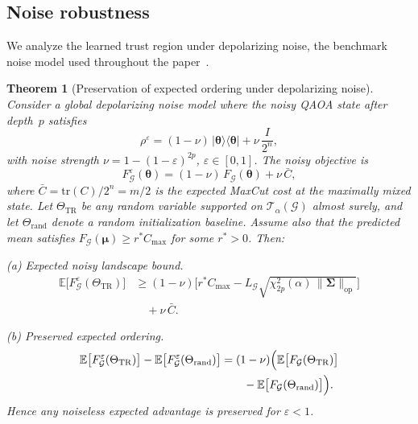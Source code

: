 \documentclass[aps,prx,reprint,superscriptaddress,longbibliography]{revtex4-2}
\newcommand{\ket}[1]{|#1\rangle}
\newcommand{\bra}[1]{\langle#1|}
\newcommand{\QAOA}{\textnormal{\textsc{QAOA}}}
\newcommand{\calG}{\mathcal{G}}
\newcommand{\calT}{\mathcal{T}}
\newcommand{\bbE}{\mathbb{E}}
\newtheorem{theorem}{Theorem}
\begin{document}
\subsection{Noise robustness}
\label{sec:noise_theory}

We analyze the learned trust region under depolarizing noise, the
benchmark noise model used throughout the paper~\cite{wang2021noise,preskill2018}.

\begin{theorem}[Preservation of expected ordering under depolarizing noise]
\label{thm:noise_robust}
Consider a global depolarizing noise model where the noisy \QAOA{}
state after depth~$p$ satisfies
\begin{equation}
    \rho^{\varepsilon} = (1 - \nu)\,
    \ket{\bm\theta}\!\bra{\bm\theta}
    + \nu\,\frac{I}{2^n},
    \label{eq:noisy_state}
\end{equation}
with noise strength $\nu = 1 - (1-\varepsilon)^{2p}$,
$\varepsilon \in [0,1]$.
The noisy objective is
\begin{equation}
    F_\calG^\varepsilon(\bm\theta)
    = (1 - \nu)\,F_\calG(\bm\theta) + \nu\,\bar{C},
    \label{eq:noisy_obj}
\end{equation}
where $\bar{C} = \mathrm{tr}(C)/2^n = m/2$ is the
expected MaxCut cost at the maximally mixed state.
Let $\Theta_{\mathrm{TR}}$ be any random variable supported on
$\calT_\alpha(\calG)$ almost surely, and let
$\Theta_{\mathrm{rand}}$ denote a random initialization baseline.
Assume also that the predicted mean satisfies
$F_\calG(\bm\mu) \ge r^* C_{\max}$ for some $r^*>0$.
Then:

\emph{(a) Expected noisy landscape bound.}
\begin{equation}
    \begin{aligned}
    \bbE\bigl[F_\calG^\varepsilon(\Theta_{\mathrm{TR}})\bigr]
    &\ge (1-\nu)\bigl[r^* C_{\max}
    - L_\calG \sqrt{\chi^2_{2p}(\alpha)\,\|\bm\Sigma\|_{\mathrm{op}}}\bigr] \\
    &\quad + \nu\,\bar{C}.
    \end{aligned}
    \label{eq:noisy_lb}
\end{equation}

\emph{(b) Preserved expected ordering.}
\begin{equation}
    \begin{aligned}
    \bbE\bigl[F_\calG^\varepsilon(\Theta_{\mathrm{TR}})\bigr]
    - \bbE\bigl[F_\calG^\varepsilon(\Theta_{\mathrm{rand}})\bigr]
    &= (1-\nu)\Bigl(\bbE\bigl[F_\calG(\Theta_{\mathrm{TR}})\bigr] \\
    &\qquad - \bbE\bigl[F_\calG(\Theta_{\mathrm{rand}})\bigr]\Bigr).
    \end{aligned}
    \label{eq:noise_ordering}
\end{equation}
Hence any noiseless expected advantage is preserved for $\varepsilon<1$.


\end{theorem}
\end{document}

